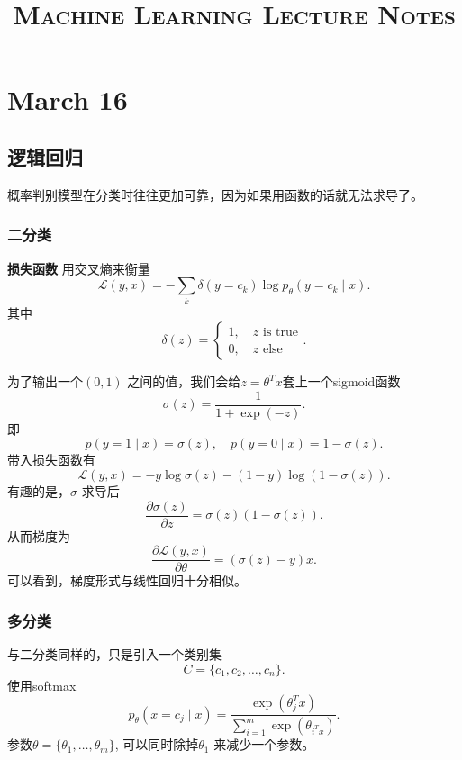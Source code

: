 
\linespread{1.5} \selectfont
\title{\textsc{Machine Learning Lecture Notes}}

\maketitle
\tableofcontents



\chapter{March 16}
\section{逻辑回归} 
概率判别模型在分类时往往更加可靠，因为如果用函数的话就无法求导了。
\subsection{二分类}
\noindent \textbf{损失函数}
用交叉熵来衡量
\[
		\mathcal{L}\left( y,x \right)  = -\sum_{k} \delta\left( y=c_{k} \right) \log p_{\theta}\left( y=c_k \mid x \right) 
.\] 
其中
\[
		\delta\left( z \right)  = \begin{cases}
				1, \quad z \text{ is true} \\
				0, \quad z \text{ else}
		\end{cases}
.\] 

为了输出一个$\left( 0,1 \right) $ 之间的值，我们会给$z=\theta^{T}x$套上一个sigmoid函数
\[
		\sigma\left( z \right)  = \frac{1}{1+\exp\left( -z \right) }
.\] 
即
\[
		p\left( y=1 \mid x \right) =\sigma\left( z \right), \quad p\left( y=0 \mid x \right) = 1-\sigma\left( z \right) 
.\] 
带入损失函数有
\[
		\mathcal{L}\left( y,x \right)  = -y\log \sigma\left( z \right)  - \left( 1-y \right) \log\left( 1-\sigma\left( z \right)  \right) 
.\] 
有趣的是，$\sigma$ 求导后
\[
		\frac{\partial \sigma\left( z \right) }{\partial z} = \sigma\left( z \right) \left( 1-\sigma\left( z \right)  \right) 
.\] 
从而梯度为
\[
		\frac{\partial \mathcal{L}\left( y,x \right) }{\partial \theta}  = \left( \sigma\left( z \right) -y \right) x
.\] 
可以看到，梯度形式与线性回归十分相似。
\subsection{多分类}
与二分类同样的，只是引入一个类别集
\[
C = \{c_1,c_2,\ldots,c_{n}\} 
.\] 
使用softmax
\[
		p_{\theta}\left( x=c_{j}  \mid  x \right)  = \frac{\exp\left( \theta_{j}^{T}x \right) }{\sum_{i=1}^{m} \exp\left( \theta_{i^{T}x} \right) }
.\] 
参数$\theta = \{\theta_{1},\ldots,\theta_{m}\} $, 可以同时除掉$\theta_{1}$ 来减少一个参数。

